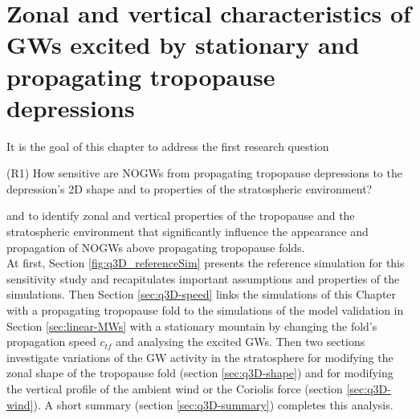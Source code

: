 \chapter{Zonal and vertical characteristics of GWs excited by stationary and propagating tropopause depressions}
\label{sec:resultsQ3D}
It is the goal of this chapter to address the first research question
\begin{tcolorbox}[]
    (R1) How sensitive are NOGWs from propagating tropopause depressions to the depression's 2D shape and to properties of the stratospheric environment?
\end{tcolorbox}
\noindent and to identify zonal and vertical properties of the tropopause and the stratospheric environment that significantly influence the appearance and propagation of NOGWs above propagating tropopause folds. \\
At first, Section \ref{fig:q3D_referenceSim} presents the reference simulation for this sensitivity study and recapitulates important assumptions and properties of the simulations. Then Section \ref{sec:q3D-speed} links the simulations of this Chapter with a propagating tropopause fold to the simulations of the model validation in Section \ref{sec:linear-MWs} with a stationary mountain by changing the fold's propagation speed $c_{tf}$ and analysing the excited GWs. Then two sections investigate variations of the GW activity in the stratosphere for modifying the zonal shape of the tropopause fold (section \ref{sec:q3D-shape}) and for modifying the vertical profile of the ambient wind or the Coriolis force (section \ref{sec:q3D-wind}).  A short summary (section \ref{sec:q3D-summary}) completes this analysis.

